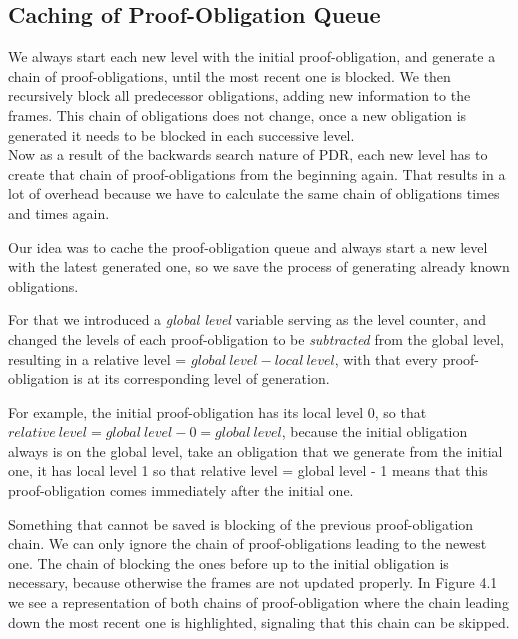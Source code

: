 \documentclass[11pt, a4paper, BCOR=10mm, ngerman]{scrbook}
\begin{document}
\subsection{Caching of Proof-Obligation Queue}
We always start each new level with the initial proof-obligation, and generate a chain of proof-obligations, until the most recent one is blocked. We then recursively block all predecessor obligations, adding new information to the frames. This chain of obligations does not change, once a new obligation is generated it needs to be blocked in each successive level.\\
Now as a result of the backwards search nature of PDR, each new level has to create that chain of proof-obligations from the beginning again. That results in a lot of overhead because we have to calculate the same chain of obligations times and times again. \par
Our idea was to cache the proof-obligation queue and always start a new level with the latest generated one, so we save the process of generating already known obligations. \par For that we introduced a \textsl{global level} variable serving as the level counter, and changed the levels of each proof-obligation to be \textsl{subtracted} from the global level, resulting in a relative level = $global\ level - local\ level$, with that every proof-obligation is at its corresponding level of generation. \par For example, the initial proof-obligation has its local level 0, so that $relative\ level = global\ level - 0 = global\ level$, because the initial obligation always is on the global level, take an obligation that we generate from the initial one, it has local level 1 so that relative level = global level - 1 means that this proof-obligation comes immediately after the initial one. \par
Something that cannot be saved is blocking of the previous proof-obligation chain. We can only ignore the chain of proof-obligations leading to the newest one. The chain of blocking the ones before up to the initial obligation is necessary, because otherwise the frames are not updated properly.
In Figure 4.1 we see a representation of both chains of proof-obligation where the chain leading down the most recent one is highlighted, signaling that this chain can be skipped.
\end{document}
